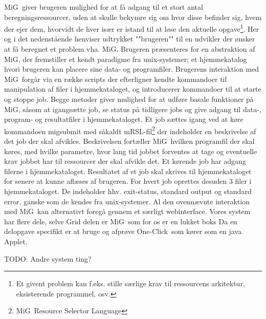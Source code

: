 \documentclass[draft,a4paper,10pt]{article}
\newcommand{\mig}{MiG}
\newcommand{\oc}{One-Click}
\begin{document}
\mig\ giver brugeren mulighed for at få adgang til et stort antal beregningsressourcer, uden at skulle bekymre sig om hvor disse befinder sig, hvem der ejer dem, hvorvidt de hver især er istand til at løse den aktuelle opgave\footnote{Et givent problem kan f.eks. stille særlige krav til ressourcens arkitektur, eksisterende programmel, osv. }. Her og i det nedenstående henviser udtrykket ""brugeren"" til en udvikler der ønsker at få beregnet et problem vha. \mig {}. Brugeren præsenteres for en abstraktion af \mig, der fremstiller et kendt paradigme fra unix-systemer; et hjemmekatalog hvori brugeren kan placere sine data- og programfiler. Brugerens interaktion med \mig\ forgår via en række scripts der efterligner kendte kommandoer til manipulation af filer i hjemmekataloget, og introducerer kommandoer til at starte og stoppe job. Begge metoder giver mulighed for at udføre basale funktioner på \mig, såsom at igangsætte job, se status på tidligere jobs og give adgang til data-, program- og resultatfiler i hjemmekataloget. Et job sættes igang ved at køre kommandoen migsubmit med såkaldt mRSL-fil\footnote{\mig\ Resource Selector Language} der indeholder en beskrivelse af det job der skal afvikles. Beskrivelsen fortæller \mig\ hvilken programfil der skal køres, med hvilke parametre, hvor lang tid jobbet forventes at tage og eventuelle krav jobbet har til ressourcer der skal afvikle det. Et kørende job har adgang filerne i  hjemmekataloget. Resultatet af et job skal skrives til hjemmekataloget for senere at kunne aflæses af brugeren. For hvert job oprettes desuden 3 filer i hjemmekataloget. De indeholder hhv. exit-status, standard output og standard error, ganske som de kendes fra unix-systemer. 
Al den ovennævnte interaktion med \mig\ kan alternativt foregå gennem et særligt webinterface. 
Vores system har flere dele, selve Grid delen er \mig\ som for os er en lukket boks
Da en delopgave specifikt er at bruge og afprøve \oc\ som kører som en java Applet.

TODO: Andre system ting?
\end{document}
